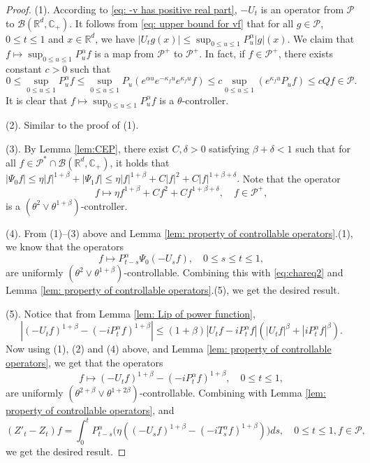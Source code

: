 \documentclass[12pt,a4paper]{amsart}
\theoremstyle{plain}
\theoremstyle{definition}
\numberwithin{equation}{section}
\begin{document}
\begin{proof}
  (1). According to \eqref{eq: -v has positive real part}, $-U_t$ is an operator from $\mathcal P$ to $\mathcal B(\mathbb R^d, \mathbb C_+)$.
  It follows from \eqref{eq: upper bound for vf} that for all $g\in \mathcal P$, $0\leq t\leq 1$ and $x\in \mathbb R^d$, we have $ |U_t g(x)| \leq \sup_{0\leq u\leq 1}P_u^\alpha |g| (x). $
  We claim that $f\mapsto\sup_{0\leq u\leq 1}P^{\alpha}_u f$ is a map from $\mathcal P^+$ to $\mathcal P^+$. In fact, if $f\in \mathcal P^+$, there exists constant $c>0$ such that
  \[
    0
    \leq \sup_{0\leq u\leq 1}P^{\alpha}_u f
    \leq \sup_{0\leq u\leq 1} P_u (e^{\alpha u} e^{-\kappa_f u} e^{\kappa_f u} f )
    \leq c \sup_{0\leq u\leq 1} (e^{\kappa_fu}P_u f) \leq c Qf \in \mathcal P.
  \]
	It is clear that $f\mapsto\sup_{0\leq u\leq 1}P^{\alpha}_u f$ is a $\theta$-controller.

  (2). Similar to the proof of (1).

  (3). By Lemma \ref{lem:CEP}, there exist $C, \delta >0$ satisfying $\beta+\delta< 1$ such that for all $ f \in \mathcal P^* \cap \mathcal B( \mathbb R^d, \mathbb C_+ )$, it holds that $ |\Psi_0 f| \leq \eta |f|^{1+\beta} + |\Psi_1 f| \leq \eta |f|^{1+\beta} + C|f|^2+ C |f|^{1+\beta + \delta}.$
  Note that the operator
  \[
    f \mapsto \eta f^{1+\beta} + Cf^2+ Cf^{1+\beta + \delta}
    , \quad f\in \mathcal P^+,
  \]
  is a $(\theta^2 \vee \theta^{1+\beta})$-controller.

  (4). From (1)--(3) above and Lemma \ref{lem: property of controllable operators}.(1), we know that the operators
  \[
    f \mapsto P^\alpha_{t-s}\Psi_0(-U_sf)
    , \quad 0\leq s\leq t\leq 1,
  \]
  are uniformly $(\theta^2\vee \theta^{1+\beta})$-controllable.
  Combining this with \eqref{eq:chareq2} and
  Lemma \ref{lem: property of controllable operators}.(5), we get the desired result.

  (5). Notice that from Lemma \ref{lem: Lip of power function},
  \[
    |(-U_t f)^{1+\beta} - (-iP^\alpha_t f)^{1+\beta} |
    \leq  (1+\beta) |U_t f-iP^\alpha_t f|(|U_t f|^{\beta}+|i P^\alpha_t f|^{\beta}).
  \]
  Now using (1), (2) and (4) above, and Lemma \ref{lem: property of controllable operators}, we get that the operators
  \[
    f \mapsto (-U_t f)^{1+\beta} - (-iP^\alpha_t f)^{1+\beta},\quad 0\leq t\leq 1,
  \]
  are uniformly $(\theta^{2+\beta}\vee \theta^{1+2\beta})$-controllable.
  Combining with Lemma \ref{lem: property of controllable operators}, and
  \[
    (Z'_t - Z_t)f
    = \int_0^t P^\alpha_{t-s}\Big( \eta ((-U_s f)^{1+\beta} - (-iT_s^\alpha f)^{1+\beta} )\Big)ds
    , \quad 0\leq t\leq 1, f\in \mathcal P,
  \]
  we get the desired result.


\end{proof}
\end{document}
